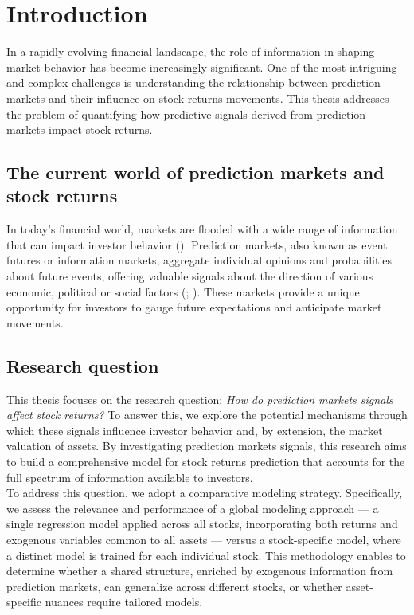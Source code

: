 \documentclass[12pt]{report}
\begin{document}
\tableofcontents

\newpage \section{Introduction}

In a rapidly evolving financial landscape, the role of information in shaping market behavior has become increasingly significant. One of the most intriguing and complex challenges is understanding the relationship between prediction markets and their influence on stock returns movements. This thesis addresses the problem of quantifying how predictive signals derived from prediction markets impact stock returns.

\subsection{The current world of prediction markets and stock returns}

In today's financial world, markets are flooded with a wide range of information that can impact investor behavior (\cite{li_effect_2014}). Prediction markets, also known as event futures or information markets, aggregate individual opinions and probabilities about future events, offering valuable signals about the direction of various economic, political or social factors (\cite{waitz_corporate_2013}; \cite{wolfers_prediction_2004}). These markets provide a unique opportunity for investors to gauge future expectations and anticipate market movements.

\subsection{Research question}

This thesis focuses on the research question: \textit{How do prediction markets signals affect stock returns?} To answer this, we explore the potential mechanisms through which these signals influence investor behavior and, by extension, the market valuation of assets. By investigating prediction markets signals, this research aims to build a comprehensive model for stock returns prediction that accounts for the full spectrum of information available to investors.\\

To address this question, we adopt a comparative modeling strategy. Specifically, we assess the relevance and performance of a global modeling approach — a single regression model applied across all stocks, incorporating both returns and exogenous variables common to all assets — versus a stock-specific model, where a distinct model is trained for each individual stock. This methodology enables to determine whether a shared structure, enriched by exogenous information from prediction markets, can generalize across different stocks, or whether asset-specific nuances require tailored models.
\end{document}
